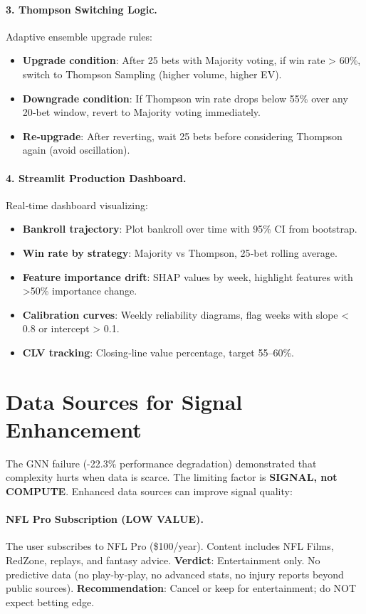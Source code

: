 \paragraph{3. Thompson Switching Logic.}
Adaptive ensemble upgrade rules:
\begin{itemize}
\item \textbf{Upgrade condition}: After 25 bets with Majority voting, if win rate > 60\%, switch to Thompson Sampling (higher volume, higher EV).
\item \textbf{Downgrade condition}: If Thompson win rate drops below 55\% over any 20‑bet window, revert to Majority voting immediately.
\item \textbf{Re‑upgrade}: After reverting, wait 25 bets before considering Thompson again (avoid oscillation).
\end{itemize}

\paragraph{4. Streamlit Production Dashboard.}
Real‑time dashboard visualizing:
\begin{itemize}
\item \textbf{Bankroll trajectory}: Plot bankroll over time with 95\% CI from bootstrap.
\item \textbf{Win rate by strategy}: Majority vs Thompson, 25‑bet rolling average.
\item \textbf{Feature importance drift}: SHAP values by week, highlight features with >50\% importance change.
\item \textbf{Calibration curves}: Weekly reliability diagrams, flag weeks with slope < 0.8 or intercept > 0.1.
\item \textbf{CLV tracking}: Closing‑line value percentage, target 55--60\%.
\end{itemize}

\section{Data Sources for Signal Enhancement}
\label{sec:data_sources}

The GNN failure (-22.3\% performance degradation) demonstrated that complexity hurts when data is scarce. The limiting factor is \textbf{SIGNAL, not COMPUTE}. Enhanced data sources can improve signal quality:

\paragraph{NFL Pro Subscription (LOW VALUE).}
The user subscribes to NFL Pro (\$100/year). Content includes NFL Films, RedZone, replays, and fantasy advice. \textbf{Verdict}: Entertainment only. No predictive data (no play‑by‑play, no advanced stats, no injury reports beyond public sources). \textbf{Recommendation}: Cancel or keep for entertainment; do NOT expect betting edge.

